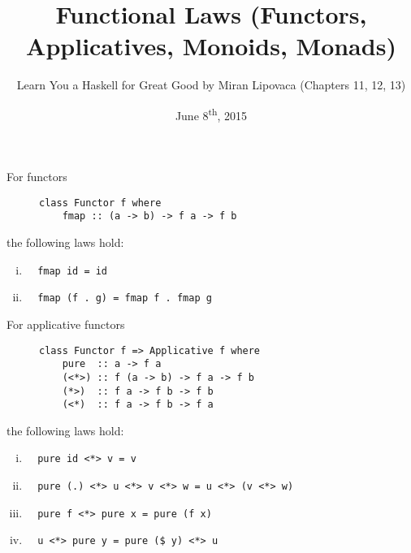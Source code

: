 \documentclass[a4paper,11pt]{article}
\title{Functional Laws (Functors, Applicatives, Monoids, Monads)}
\author{Learn You a Haskell for Great Good by Miran Lipovaca (Chapters 11, 12, 13)}
\date{June 8\textsuperscript{th}, 2015}
\begin{document}
\maketitle
{}

\begin{outline}

    For functors
    \begin{figure}[thp]
      \centering 
      \begin{minipage}{0.4\textwidth}
        \begin{verbatim}
class Functor f where
    fmap :: (a -> b) -> f a -> f b
        \end{verbatim}
      \end{minipage}
    \end{figure}
    
    the following laws hold:
    \begin{enumerate}[i.]
      \item 
        \begin{verbatim}
  fmap id = id
        \end{verbatim}
      \item
        \begin{verbatim}
  fmap (f . g) = fmap f . fmap g
        \end{verbatim}
    \end{enumerate}
    
    For applicative functors
    \begin{figure}[thp]
      \centering 
      \begin{minipage}{0.4\textwidth}
        \begin{verbatim}
class Functor f => Applicative f where
    pure  :: a -> f a
    (<*>) :: f (a -> b) -> f a -> f b
    (*>)  :: f a -> f b -> f b
    (<*)  :: f a -> f b -> f a
        \end{verbatim}
      \end{minipage}
    \end{figure}
    
    the following laws hold:
    \begin{enumerate}[i.]
      \item
        \begin{verbatim}
  pure id <*> v = v
        \end{verbatim}
      \item
        \begin{verbatim}
  pure (.) <*> u <*> v <*> w = u <*> (v <*> w)
        \end{verbatim}
      \item
        \begin{verbatim}
  pure f <*> pure x = pure (f x)
        \end{verbatim}
      \item
        \begin{verbatim}
  u <*> pure y = pure ($ y) <*> u
        \end{verbatim}
    \end{enumerate}
  

\end{outline}
\end{document}
